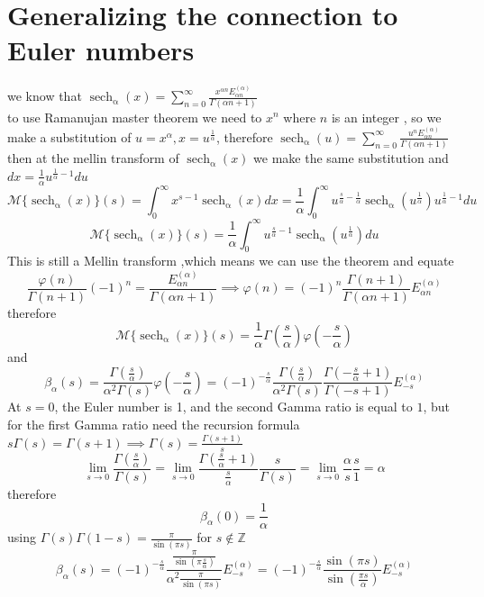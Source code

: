\documentclass{article}
\DeclareMathOperator{\sech}{sech}
\newcommand{\NotDefinedsech}[2]{\operatorname{\sech_{#1}\text{#2}}}
\begin{document}
\section{Generalizing the connection to Euler numbers}
we know that $\NotDefinedsech{\alpha}{}(x)=\sum_{n=0}^{\infty}\frac{x^{\alpha n}E^{(\alpha)}_{\alpha n}}{\Gamma(\alpha n+1)}$\\
to use Ramanujan master theorem we need to $x^n$ where $n$ is an integer , so we make a substitution of $u=x^{\alpha},x=u^{\frac{1}{\alpha}}$, therefore
$\NotDefinedsech{\alpha}{}(u)=\sum_{n=0}^{\infty}\frac{u^nE^{(\alpha)}_{\alpha n}}{\Gamma(\alpha n+1)}$\\
then at the mellin transform of $\NotDefinedsech{\alpha}{}(x)$ we make the same substitution and $dx=\frac{1}{\alpha}u^{\frac{1}{\alpha}-1}du$
\[\mathcal{M}\{\NotDefinedsech{\alpha}{}(x)\}(s)=\int_{0}^{\infty}x^{s-1}\NotDefinedsech{\alpha}{}(x)dx = \frac{1}{\alpha}\int_{0}^{\infty}u^{\frac{s}{\alpha}-\frac{1}{\alpha}}\NotDefinedsech{\alpha}{}(u^{\frac{1}{\alpha}})u^{\frac{1}{\alpha}-1}du\]
\[\mathcal{M}\{\NotDefinedsech{\alpha}{}(x)\}(s) = \frac{1}{\alpha}\int_{0}^{\infty}u^{\frac{s}{\alpha}-{1}}\NotDefinedsech{\alpha}{}(u^{\frac{1}{\alpha}})du\]
This is still a Mellin transform ,which means we can use the theorem and equate
\[\frac{\varphi(n)}{\Gamma(n+1)}(-1)^n=\frac{E_{\alpha n}^{(\alpha)}}{\Gamma(\alpha n +1)}\implies \varphi(n) = (-1)^n\frac{\Gamma(n+1)}{\Gamma(\alpha n +1)}E_{\alpha n}^{(\alpha)}\]
therefore
\[\mathcal{M}\{\NotDefinedsech{\alpha}{}(x)\}(s)=\frac{1}{\alpha}\Gamma(\frac{s}{\alpha})\varphi(-\frac{s}{\alpha})\]
and
\[\beta_\alpha(s) = \frac{\Gamma(\frac{s}{\alpha})}{\alpha^2\Gamma(s)}\varphi(-\frac{s}{\alpha}) = (-1)^{-\frac{s}{\alpha}}\frac{\Gamma(\frac{s}{\alpha})}{\alpha^2\Gamma(s)}\frac{\Gamma(-\frac{s}{\alpha}+1)}{\Gamma(-s +1)}E_{-s}^{(\alpha)}\]
At $s=0$, the Euler number is 1, and the second Gamma ratio is equal to $1$, but for the first Gamma ratio need the recursion formula $s\Gamma(s) = \Gamma(s+1)\implies \Gamma(s) = \frac{\Gamma(s+1)}{s}$
\[\lim_{s\to 0}\frac{\Gamma(\frac{s}{\alpha})}{\Gamma(s)} = \lim_{s\to 0}\frac{\Gamma(\frac{s}{\alpha}+1)}{\frac{s}{\alpha}}\frac{s}{\Gamma(s)}=\lim_{s\to 0}\frac{\alpha}{s}\frac{s}{1} = \alpha\]
therefore
\[\beta_{\alpha}(0) = \frac{1}{\alpha}\]
using $\Gamma(s)\Gamma(1-s)=\frac{\pi}{\sin(\pi s)}$ for $s\not\in \mathbb{Z}$
\[\beta_\alpha(s) = (-1)^{-\frac{s}{\alpha}}\frac{\frac{\pi}{\sin(\pi\frac{s}{\alpha})}}{\alpha^2\frac{\pi}{\sin(\pi s)}}E_{-s}^{(\alpha)}=(-1)^{-\frac{s}{\alpha}} \frac{\sin(\pi s)}{\sin(\frac{\pi s}{\alpha})}E^{(\alpha)}_{-s}\]
\end{document}
